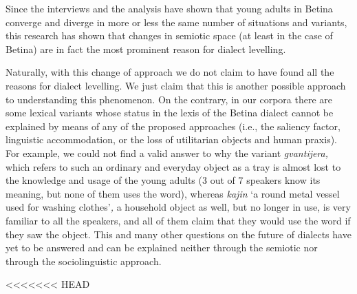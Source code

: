 \documentclass[output=paper]{LSP/langsci}
\begin{document}
Since the interviews and the analysis have shown that young adults in Betina converge and diverge in more or less the same number of situations and variants, this research has shown that changes in semiotic space (at least in the case of Betina) are in fact the most prominent reason for dialect levelling. 

Naturally, with this change of approach we do not claim to have found all the reasons for dialect levelling. We just claim that this is another possible approach to understanding this phenomenon. On the contrary, in our corpora there are some lexical variants whose status in the lexis of the Betina dialect cannot be explained by means of any of the proposed approaches (i.e., the saliency factor, linguistic accommodation, or the loss of utilitarian objects and human praxis). For example, we could not find a valid answer to why the variant \textit{gvantijera, }which refers to such an ordinary and everyday object as a tray is almost lost to the knowledge and usage of the young adults (3 out of 7 speakers know its meaning, but none of them uses the word), whereas \textit{kajin }‘a round metal vessel used for washing clothes’\textit{, }a household object as well, but no longer in use, is very familiar to all the speakers, and all of them claim that they would use the word if they saw the object. This and many other questions on the future of dialects have yet to be answered and can be explained neither through the semiotic nor through the sociolinguistic approach.

\printbibliography[heading=subbibliography,notkeyword=this]
<<<<<<< HEAD
\end{document}
